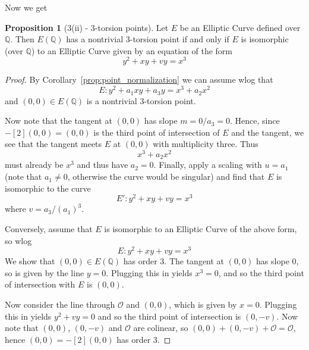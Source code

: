 \documentclass{scrartcl}
\newcommand{\Q}{\mathbb{Q}}
\renewcommand{\O}{\mathcal{O}}
\theoremstyle{definition}
\newtheorem{prop}[subsection]{Proposition}
\begin{document}
Now we get
\begin{prop}[3(ii) - 3-torsion points]
    Let $E$ be an Elliptic Curve defined over $\Q$.
    Then $E(\Q)$ has a nontrivial 3-torsion point if and only if $E$ is isomorphic (over $\Q$) to an Elliptic Curve given by an equation of the form
    \begin{equation*}
        y^2 + x y + v y = x^3
    \end{equation*}
\end{prop}
\begin{proof}
    By Corollary~\ref{prop:point_normalization} we can assume wlog that
    \begin{equation*}
        E: y^2 + a_1 x y + a_3 y = x^3 + a_2 x^2
    \end{equation*}
    and $(0, 0) \in E(\Q)$ is a nontrivial 3-torsion point.

    Now note that the tangent at $(0, 0)$ has slope $m = 0/a_3 = 0$.
    Hence, since $-[2](0, 0) = (0, 0)$ is the third point of intersection of $E$ and the tangent, we see that the tangent meets $E$ at $(0, 0)$ with multiplicity three.
    Thus
    \begin{equation*}
        x^3 + a_2 x^2 
    \end{equation*}
    must already be $x^3$ and thus have $a_2 = 0$.
    Finally, apply a scaling with $u = a_1$ (note that $a_1 \neq 0$, otherwise the curve would be singular) and find that $E$ is isomorphic to the curve
    \begin{equation*}
        E': y^2 + x y + v y = x^3
    \end{equation*}
    where $v = a_3 / (a_1)^3$.

    Conversely, assume that $E$ is isomorphic to an Elliptic Curve of the above form, so wlog
    \begin{equation*}
        E: y^2 + x y + v y = x^3
    \end{equation*}
    We show that $(0, 0) \in E(\Q)$ has order 3.
    The tangent at $(0, 0)$ has slope $0$, so is given by the line $y = 0$.
    Plugging this in yields $x^3 = 0$, and so the third point of intersection with $E$ is $(0, 0)$.
    
    Now consider the line through $\O$ and $(0, 0)$, which is given by $x = 0$.
    Plugging this in yields $y^2 + v y = 0$ and so the third point of intersection is $(0, -v)$.
    Now note that $(0, 0)$, $(0, -v)$ and $\O$ are colinear, so $(0, 0) + (0, -v) + \O = \O$, hence $(0, 0) = -[2](0, 0)$ has order 3.
\end{proof}
\end{document}
